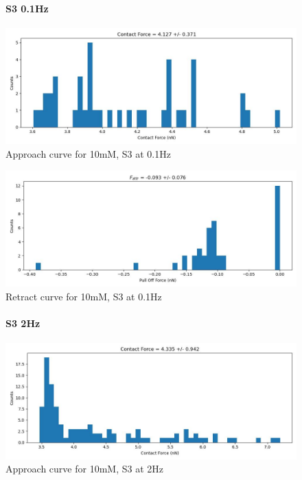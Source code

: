 \newpage


\begin{figure}[h!]
\paragraph{S3 0.1Hz}
\centering
\includegraphics[width=\textwidth]{chapter7/Tip speed/10mM/S3 0.1Hz/approach_f_c_hist.jpg}
\caption{Approach curve for 10mM, S3 at 0.1Hz}
\end{figure}

\begin{figure}[h!]
\centering
\includegraphics[width=\textwidth]{chapter7/Tip speed/10mM/S3 0.1Hz/retract_f_a_hist.jpg}
\caption{Retract curve for 10mM, S3 at 0.1Hz}
\end{figure}

\newpage


\begin{figure}[h!]
\paragraph{S3 2Hz}
\centering
\includegraphics[width=\textwidth]{chapter7/Tip speed/10mM/S3 2Hz/approach_f_c_hist.jpg}
\caption{Approach curve for 10mM, S3 at 2Hz}
\end{figure}

